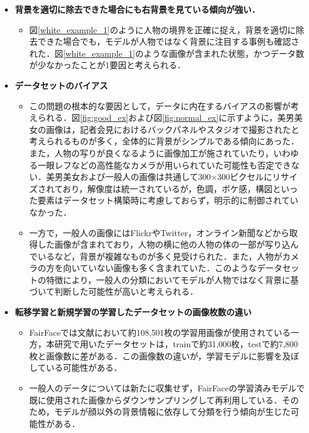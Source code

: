 \documentclass[a4paper,11pt,titlepage]{jsarticle}
\begin{document}
\begin{itemize}
  \item \textbf{背景を適切に除去できた場合にも右背景を見ている傾向が強い．}
  \begin{itemize}
  \item 図\ref{white_example_1}のように人物の境界を正確に捉え，背景を適切に除去できた場合でも，モデルが人物ではなく背景に注目する事例も確認された．図\ref{white_example_1}のような画像が含まれた状態，かつデータ数が少なかったことが1要因と考えられる．
  \end{itemize}
  \item \textbf{データセットのバイアス}
    \begin{itemize}
      \item この問題の根本的な要因として，データに内在するバイアスの影響が考えられる．図\ref{fig:good_ex}および図\ref{fig:normal_ex}に示すように，美男美女の画像は，記者会見におけるバックパネルやスタジオで撮影されたと考えられるものが多く，全体的に背景がシンプルである傾向にあった．また，人物の写りが良くなるように画像加工が施されていたり，いわゆる一眼レフなどの高性能なカメラが用いられていた可能性も否定できない．美男美女および一般人の画像は共通して300×300ピクセルにリサイズされており，解像度は統一されているが，色調，ボケ感，構図といった要素はデータセット構築時に考慮しておらず，明示的に制御されていなかった．
      \item 一方で，一般人の画像にはFlickrやTwitter，オンライン新聞などから取得した画像が含まれており，人物の横に他の人物の体の一部が写り込んでいるなど，背景が複雑なものが多く見受けられた．また，人物がカメラの方を向いていない画像も多く含まれていた．このようなデータセットの特徴により，一般人の分類においてモデルが人物ではなく背景に基づいて判断した可能性が高いと考えられる．
    \end{itemize}
    \item \textbf{転移学習と新規学習の学習したデータセットの画像枚数の違い}
  \begin{itemize}
    \item FairFaceでは文献\cite{karkkainenFairFace}において約108,501枚の学習用画像が使用されている一方，本研究で用いたデータセットは，trainで約31,000枚，testで約7,800枚と画像数に差がある．この画像数の違いが，学習モデルに影響を及ぼしている可能性がある．
    \item 一般人のデータについては新たに収集せず，FairFaceの学習済みモデルで既に使用された画像からダウンサンプリングして再利用している．そのため，モデルが顔以外の背景情報に依存して分類を行う傾向が生じた可能性がある．
  \end{itemize}
\end{itemize}
\end{document}
